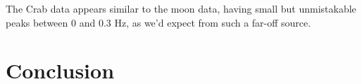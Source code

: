 \documentclass[11pt]{article}
\begin{document}
The Crab data appears similar to the moon data, having small but unmistakable peaks between 0 and 0.3 Hz, as we'd expect from such a far-off source. 




\section{Conclusion}

\end{document}
